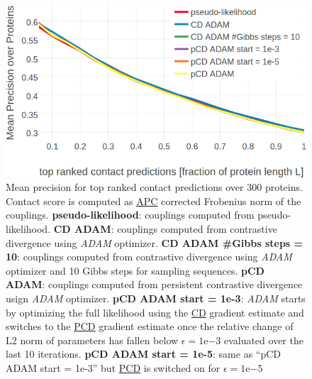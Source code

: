 \documentclass[11pt,a4paper,twoside]{book}
\newcommand{\eq}{\!=\!}
\theoremstyle{definition}
\theoremstyle{definition}
\theoremstyle{remark}
\begin{document}
\begin{figure}

{\centering \includegraphics[width=0.9\linewidth]{img/full_likelihood/adam/precision_vs_rank_adam_gibbs_pcd} 

}

\caption{Mean precision for top ranked contact
predictions over 300 proteins. Contact score is computed as
\protect\hyperlink{abbrev}{APC} corrected Frobenius norm of the
couplings. \textbf{pseudo-likelihood}: couplings computed from
pseudo-likelihood. \textbf{CD ADAM}: couplings computed from contrastive
divergence using \emph{ADAM} optimizer. \textbf{CD ADAM \#Gibbs steps =
10}: couplings computed from contrastive divergence using \emph{ADAM}
optimizer and 10 Gibbs steps for sampling sequences. \textbf{pCD ADAM}:
couplings computed from persistent contrastive divergence usign
\emph{ADAM} optimizer. \textbf{pCD ADAM start = 1e-3}: \emph{ADAM}
starts by optimizing the full likelihood using the
\protect\hyperlink{abbrev}{CD} gradient estimate and switches to the
\protect\hyperlink{abbrev}{PCD} gradient estimate once the relative
change of L2 norm of parameters has fallen below
\(\epsilon \eq \mathrm{1e}{-3}\) evaluated over the last 10 iterations.
\textbf{pCD ADAM start = 1e-5}: same as ``pCD ADAM start = 1e-3'' but
\protect\hyperlink{abbrev}{PCD} is switched on for
\(\epsilon \eq \mathrm{1e}{-5}\)}\label{fig:precision-cd-adam}
\end{figure}
\end{document}

